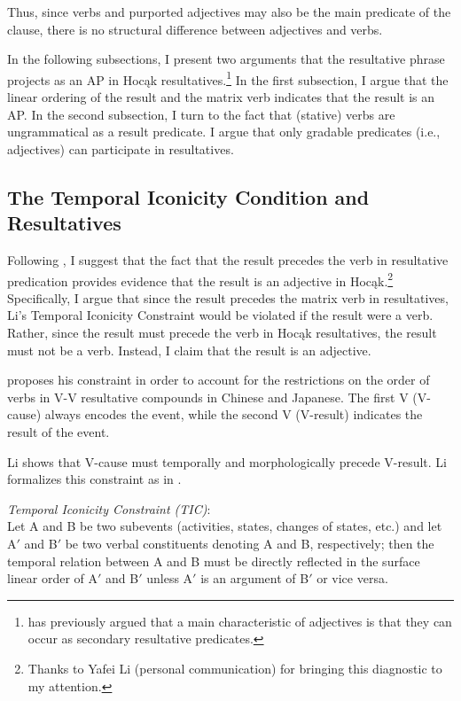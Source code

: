 \documentclass[output=paper]{LSP/langsci}
\begin{document}
Thus, since verbs and purported adjectives may also be the main predicate of the clause, there is no structural difference between adjectives and verbs.

In the following subsections, I present two arguments that the resultative phrase projects as an AP in Hocąk resultatives.\footnote{\citet{Baker2003} has previously argued that a main characteristic of adjectives is that they can occur as secondary resultative predicates.} In the first subsection, I argue that the linear ordering of the result and the matrix verb indicates that the result is an AP. In the second subsection, I turn to the fact that (stative) verbs are ungrammatical as a result predicate. I argue that only gradable predicates (i.e., adjectives) can participate in resultatives. 

\subsection{The Temporal Iconicity Condition and Resultatives}

Following \citet{Li1993}, I suggest that the fact that the result precedes the verb in resultative predication provides evidence that the result is an adjective in Hocąk.\footnote{Thanks to Yafei Li (personal communication) for bringing this diagnostic to my attention.} Specifically, I argue that since the result precedes the matrix verb in resultatives, Li's  Temporal Iconicity Constraint would be violated if the result were a verb. Rather, since the result must precede the verb in Hocąk resultatives, the result must not be a verb. Instead, I claim that the result is an adjective.

\citet[499]{1993} proposes his constraint in order to account for the restrictions on the order of verbs in V-V resultative compounds in Chinese and Japanese. The first V (V-cause) always encodes the event, while the second V (V-result) indicates the result of the event. 

Li shows that V-cause must temporally and morphologically precede V-result. Li formalizes this constraint as in .

\begin{exe}

\ex\label{ex:rosen:32}
 \emph{Temporal Iconicity Constraint (TIC)}:\\
 Let A and B be two subevents (activities, states, changes of states, etc.) and let A$'$ and B$'$ be two verbal constituents denoting A and B, respectively; then the temporal relation between A and B must be directly reflected in the surface linear order of A$'$ and B$'$ unless A$'$ is an argument of B$'$ or vice versa.
 
 \end{exe}
\end{document}
